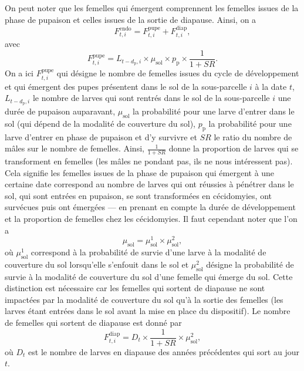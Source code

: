 On peut noter que les femelles qui émergent comprennent les femelles issues de la phase de pupaison et celles issues de la sortie de diapause. Ainsi, on a
\[
F^{\text{endo}}_{t, i} = F^{\text{pupe}}_{t, i} + F^{\text{diap}}_{t,i},
\]
avec
\[
F^{\text{pupe}}_{t, i} = L_{t - d_{\text{p}}, i} \times \mu_{\text{sol}} \times p_{\text{p}} \times \frac{1}{1 + \mathit{SR}}.
\]
On a ici $F^{\text{pupe}}_{t, i}$ qui désigne le nombre de femelles issues du cycle de développement et qui émergent des pupes présentent dans le sol de la sous-parcelle $i$ à la date $t$, $L_{t - d_{\text{p}}, i}$ le nombre de larves qui sont rentrés dans le sol de la sous-parcelle $i$ une durée de pupaison auparavant, $\mu_{\text{sol}}$ la probabilité pour une larve d'entrer dans le sol (qui dépend de la modalité de couverture du sol), $p_{\text{p}}$ la probabilité pour une larve d'entrer en phase de pupaison et d'y survivre et $\mathit{SR}$ le ratio du nombre de mâles sur le nombre de femelles. 
Ainsi, $\frac{1}{1 + \mathit{SR}}$ donne la proportion de larves qui se transforment en femelles (les mâles ne pondant pas, ils ne nous intéressent pas).
Cela signifie les femelles issues de la phase de pupaison qui émergent à une certaine date correspond au nombre de larves qui ont réussies à pénétrer dans le sol, qui sont entrées en pupaison, se sont transformées en cécidomyies, ont survécues puis ont émergées --- en prenant en compte la durée de développement et la proportion de femelles chez les cécidomyies.
Il faut cependant noter que l'on a
\[
\mu_{\text{sol}} = \mu_{\text{sol}}^1 \times \mu_{\text{sol}}^2,
\]
où $\mu_{\text{sol}}^1$ correspond à la probabilité de survie d'une larve à la modalité de couverture du sol lorsqu'elle s'enfouit dans le sol et $\mu_{\text{sol}}^2$ désigne la probabilité de survie à la modalité de couverture du sol d'une femelle qui émerge du sol.
Cette distinction est nécessaire car les femelles qui sortent de diapause ne sont impactées par la modalité de couverture du sol qu'à la sortie des femelles (les larves étant entrées dans le sol avant la mise en place du dispositif).
Le nombre de femelles qui sortent de diapause est donné par 
\[
F_{t, i}^{\text{diap}} = D_{t} \times \frac{1}{1 + \mathit{SR}} \times \mu^{2}_{\text{sol}},
\]
où $D_{t}$ est le nombre de larves en diapause des années précédentes qui sort au jour $t$.



